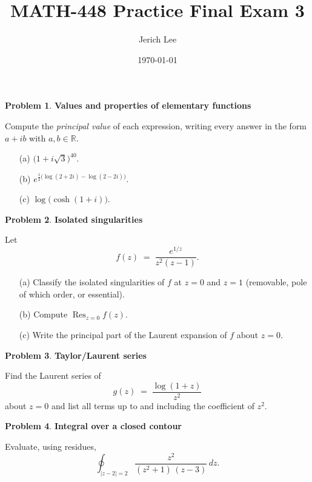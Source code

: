 \documentclass[12pt]{article}
\title{MATH-448 Practice Final Exam 3}
\author{Jerich Lee}
\date{\today}
\theoremstyle{definition} %
\newtheorem{problem}{Problem}
\theoremstyle{plain} %
\begin{document}
\maketitle
\pagebreak

  
  \begin{problem}
  \textbf{Values and properties of elementary functions}  
  
  Compute the \emph{principal value} of each expression, writing every answer in the form \(a+ib\) with \(a,b\in\mathbb{R}\).
  \begin{enumerate}\itemsep6pt
    \item[(a)] \(\displaystyle\bigl(1+i\sqrt{3}\bigr)^{40}\).
    \item[(b)] \(\displaystyle e^{\frac12\bigl(\log(2+2i)-\log(2-2i)\bigr)}\).
    \item[(c)] \(\displaystyle \log\!\bigl(\cosh(1+i)\bigr)\).
  \end{enumerate}
  \end{problem}
  
  \pagebreak
  
  \begin{problem}
  \textbf{Isolated singularities}  
  
  Let  
  \[
    f(z)\;=\;\frac{e^{1/z}}{z^{2}(z-1)}.
  \]
  \begin{enumerate}\itemsep6pt
    \item[(a)] Classify the isolated singularities of \(f\) at \(z=0\) and \(z=1\) (removable, pole of which order, or essential).
    \item[(b)] Compute \(\displaystyle \operatorname*{Res}_{z=0}f(z)\).
    \item[(c)] Write the principal part of the Laurent expansion of \(f\) about \(z=0\).
  \end{enumerate}
  \end{problem}
  
  \pagebreak
  
  \begin{problem}
  \textbf{Taylor/Laurent series}  
  
  Find the Laurent series of  
  \[
    g(z)\;=\;\frac{\log(1+z)}{z^{2}}
  \]
  about \(z=0\) and list all terms up to and including the coefficient of \(z^{2}\).
  \end{problem}
  
  \pagebreak
  
  \begin{problem}
  \textbf{Integral over a closed contour}  
  
  Evaluate, using residues,
  \[
    \oint_{\lvert z-2\rvert = 2}
    \frac{z^{2}}{(z^{2}+1)\,(z-3)}\,dz.
  \]
  \end{problem}
  
\end{document}
